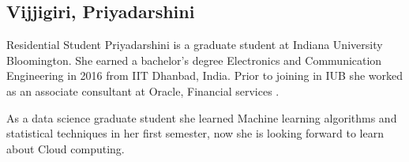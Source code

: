 \subsection{Vijjigiri, Priyadarshini}

Residential Student
Priyadarshini is a graduate student at Indiana University Bloomington. She earned a bachelor’s degree Electronics and Communication Engineering in 2016 from IIT Dhanbad, India. Prior to joining in IUB she worked as an associate consultant at Oracle, Financial services .
 
As a data science graduate student she learned Machine learning algorithms and statistical techniques in her first semester, now she is looking forward to learn about Cloud computing.

